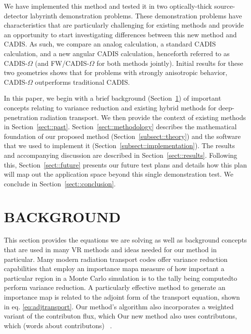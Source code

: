 \documentclass[12pt]{article}
\begin{document}
We have implemented this method and tested it in two optically-thick source-detector labyrinth demonstration problems. 
These demonstration problems have characteristics that are particularly challenging for existing methods and provide an opportunity to start investigating differences between this new method and CADIS.
As such, we compare an analog calculation, a standard CADIS calculation, and a new angular CADIS calculation, henceforth referred to as CADIS-$\Omega$ (and FW/CADIS-$\Omega$ for both methods jointly). Initial results for these two geometries shows that for problems with strongly anisotropic behavior, CADIS-$\Omega$ outperforms traditional CADIS.

In this paper, we begin with a brief background (Section~\ref{sect::second}) of important concepts relating to variance reduction and existing hybrid methods for deep-penetration radiation transport.
We then provide the context of existing methods in Section~\ref{sect::past}. 
Section~\ref{sect::methodology} describes the mathematical foundation of our proposed method (Section~\ref{subsect::theory}) and the software that we used to implement it (Section~\ref{subsect::implementation}). 
The results and accompanying discussion are described in Section~\ref{sect::results}. Following this, Section~\ref{sect::future} presents our future test plans and details how this plan will map out the application space beyond this single demonstration test. 
We conclude in Section~\ref{sect::conclusion}. 


%
\section{BACKGROUND}
\label{sect::second}

This section provides the equations we are solving as well as background concepts that are used in many VR methods and ideas needed for our method in particular. 
Many modern radiation transport codes offer variance reduction capabilities that employ an importance map\textemdash a measure of how important a particular region in a Monte Carlo simulation is to the tally being computed\textemdash to perform variance reduction. A particularly effective method to generate an importance map is related to the adjoint form of the transport equation, shown in eq. \eqref{eq:adjtransport}. 
Our method's algorithm also incorporates a weighted variant of the contributon flux, which 
Our new method also uses contributons, which (words about contributons) ~\cite{williams_contributorn_1992}. 
\end{document}
